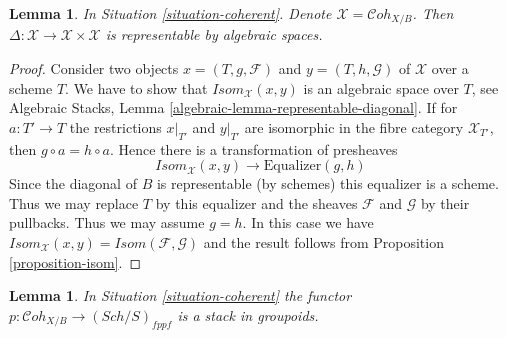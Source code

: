 \documentclass{stacks-project}
\theoremstyle{plain}
\newtheorem{lemma}[subsection]{Lemma}
\theoremstyle{definition}
\theoremstyle{remark}
\numberwithin{equation}{subsection}
\def\Sch{\mathit{Sch}}
\def\Cohstack{\mathcal{C}\!\mathit{oh}}
\begin{document}
\begin{lemma}
\label{lemma-coherent-diagonal}
In Situation \ref{situation-coherent}. Denote
$\mathcal{X} = \Cohstack_{X/B}$. Then
$\Delta : \mathcal{X} \to \mathcal{X} \times \mathcal{X}$ is
representable by algebraic spaces.
\end{lemma}

\begin{proof}
Consider two objects $x = (T, g, \mathcal{F})$ and $y = (T, h, \mathcal{G})$
of $\mathcal{X}$ over a scheme $T$. We have to show that
$\mathit{Isom}_\mathcal{X}(x, y)$ is an algebraic space over $T$, see
Algebraic Stacks, Lemma \ref{algebraic-lemma-representable-diagonal}.
If for $a : T' \to T$ the restrictions $x|_{T'}$ and $y|_{T'}$ are isomorphic
in the fibre category $\mathcal{X}_{T'}$, then $g \circ a = h \circ a$.
Hence there is a transformation of presheaves
$$
\mathit{Isom}_\mathcal{X}(x, y) \longrightarrow \text{Equalizer}(g, h)
$$
Since the diagonal of $B$ is representable (by schemes) this equalizer is
a scheme. Thus we may replace $T$ by this equalizer and the sheaves
$\mathcal{F}$ and $\mathcal{G}$ by their pullbacks. Thus we may assume
$g = h$. In this case we have
$\mathit{Isom}_\mathcal{X}(x, y) = \mathit{Isom}(\mathcal{F}, \mathcal{G})$
and the result follows from Proposition \ref{proposition-isom}.
\end{proof}

\begin{lemma}
\label{lemma-coherent-stack}
In Situation \ref{situation-coherent} the functor
$p : \Cohstack_{X/B} \longrightarrow (\Sch/S)_{fppf}$
is a stack in groupoids.
\end{lemma}
\end{document}

